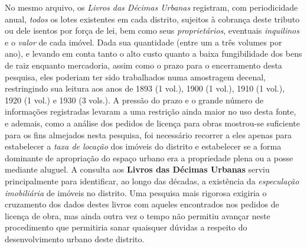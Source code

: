 No mesmo arquivo, os \textit{Livros das Décimas Urbanas} registram, com periodicidade anual, \textit{todos} os lotes existentes em cada distrito, sujeitos à cobrança deste tributo ou dele isentos por força de lei, bem como seus \textit{proprietários}, eventuais \textit{inquilinos} e o \textit{valor} de cada imóvel. Dada sua quantidade (entre um a três volumes por ano), e levando em conta tanto o alto custo quanto a baixa fungibilidade dos bens de raiz enquanto mercadoria, assim como o prazo para o encerramento desta pesquisa, eles poderiam ter sido trabalhados numa amostragem decenal, restringindo sua leitura aos anos de 1893 (1 vol.), 1900 (1 vol.), 1910 (1 vol.), 1920 (1 vol.) e 1930 (3 vols.). A pressão do prazo e o grande número de informações registradas levaram a uma restrição ainda maior no uso desta fonte, e ademais, como a análise dos pedidos de licença para obras mostrou-se suficiente para os fins almejados nesta pesquisa, foi necessário recorrer a eles apenas para estabelecer a \textit{taxa de locação} dos imóveis do distrito e estabelecer se a forma dominante de apropriação do espaço urbano era a propriedade plena ou a posse mediante aluguel. A consulta aos \textbf{Livros das Décimas Urbanas} serviu principalmente para identificar, ao longo das décadas, a existência da \textit{especulação imobiliária} de imóveis no distrito. Uma pesquisa mais rigorosa exigiria o cruzamento dos dados destes livros com aqueles encontrados nos pedidos de licença de obra, mas ainda outra vez o tempo não permitiu avançar neste procedimento que permitiria sanar quaisquer dúvidas a respeito do desenvolvimento urbano deste distrito.

